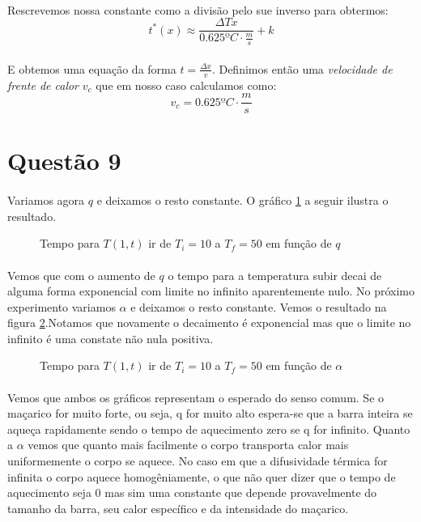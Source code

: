 \documentclass[a4paper,11pt]{article}
\begin{document}
\paragraph{}Rescrevemos nossa constante como a divisão pelo sue inverso para obtermos:
\begin{displaymath}
	t^*(x) \approx  \frac{\Delta T x}{0.625 ºC \cdot \frac{m}{s}} +  k 
\end{displaymath}

\paragraph{}E obtemos uma equação da forma $t = \frac{\Delta x}{v}$. Definimos então uma \emph{velocidade de frente de calor} $v_c$ que em nosso caso calculamos como:
\begin{equation}
	v_c = 0.625 ºC \cdot \frac{m}{s}
\end{equation}

\section*{Questão 9}
\paragraph{} Variamos agora $q$ e deixamos o resto constante. O gráfico \ref{graph:9-1} a seguir ilustra o resultado.
\begin{figure}[!htp]
	\centering
	
	\caption{Tempo para $T(1, t)$ ir de $T_i = 10$ a $T_f = 50$ em função de $q$}
	\label{graph:9-1}
\end{figure} 
\paragraph{}Vemos que com o aumento de $q$ o tempo para a temperatura subir decai de alguma forma exponencial com limite no infinito aparentemente nulo. No próximo experimento variamos $\alpha$ e deixamos o resto constante. Vemos o resultado na figura \ref{graph:9-2}.Notamos que novamente o decaimento é exponencial mas que o limite no infinito é uma constate não nula positiva.
\FloatBarrier
\begin{figure}[!htp]
	\centering
	
	\caption{Tempo para $T(1, t)$ ir de $T_i = 10$ a $T_f = 50$ em função de $\alpha$}
	\label{graph:9-2}
\end{figure} 
\FloatBarrier

\paragraph{} Vemos que ambos os gráficos representam o esperado do senso comum. Se o maçarico for muito forte, ou seja, q for muito alto espera-se que a barra inteira se aqueça rapidamente sendo o tempo de aquecimento zero se q for infinito. Quanto a $\alpha$ vemos que quanto mais facilmente o corpo transporta calor mais uniformemente o corpo se aquece. No caso em que a difusividade térmica for infinita o corpo aquece homogêniamente, o que não quer dizer que o tempo de aquecimento seja 0 mas sim uma constante que depende provavelmente do tamanho da barra, seu calor específico e da intensidade do maçarico. 
\end{document}
